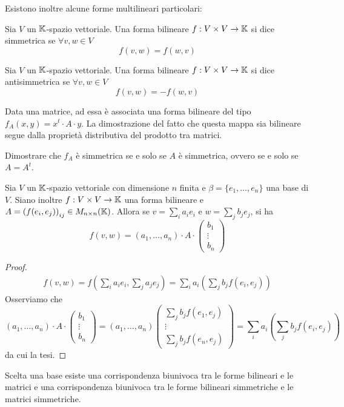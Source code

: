 \documentclass{article}     %
\begin{document}
Esistono inoltre alcune forme multilineari particolari:
\begin{boxdef}
    Sia $V$ un $\mathbb{K}$-spazio vettoriale. Una forma bilineare $f:V\times V \to \mathbb{K}$ si dice simmetrica se $\forall v, w\in V$
    \[f(v,w)=f(w,v)\]
\end{boxdef}
\begin{boxdef}
    Sia $V$ un $\mathbb{K}$-spazio vettoriale. Una forma bilineare $f:V\times V \to \mathbb{K}$ si dice antisimmetrica se $\forall v, w\in V$
    \[f(v,w)=-f(w,v)\]
\end{boxdef}
Data una matrice, ad essa è associata una forma bilineare del tipo $f_A(x,y)=x^t\cdot A \cdot y$. La dimostrazione del fatto che questa mappa sia bilineare segue dalla proprietà distributiva del prodotto tra matrici.
\begin{exc}\label{exc: simmetriche sse}
    Dimostrare che $f_A$ è simmetrica se e solo se $A$ è simmetrica, ovvero se e solo se $A=A^t$. 
\end{exc}



\begin{shadedTheorem}
    Sia $V$ un $\mathbb{K}$-spazio vettoriale con dimensione $n$ finita e $\beta=\{e_1, \dots, e_n\}$ una base di $V$. Siano inoltre $f:V\times V \to \mathbb{K}$ una forma bilineare e $A=\left( f(e_i,e_j) \right)_{ij}\in M_{n\times n }(\mathbb{K})$. Allora se $v=\sum_ia_ie_i$ e $w=\sum _jb_je_j$, si ha 
    \[f(v,w)=\left( a_1,\dots, a_n \right) \cdot A \cdot \begin{pmatrix}
        b_1\\\vdots\\ b_n
    \end{pmatrix}\]
\end{shadedTheorem}
\begin{proof}
    \[
    \begin{aligned}
        f(v,w)= f\left(\sum_ia_ie_i,\sum_ja_je_j\right)= \sum_ia_i\left( \sum_j b_jf(e_i,e_j) \right)
    \end{aligned}
    \]
    Osserviamo che 
    \[\left( a_1,\dots, a_n \right) \cdot A \cdot \begin{pmatrix}
        b_1\\\vdots\\ b_n
    \end{pmatrix} = \left( a_1,\dots, a_n \right)\begin{pmatrix}
        \sum_j b_jf(e_1,e_j)\\ \vdots \\ \sum_j b_jf(e_n,e_j)
    \end{pmatrix}  = \sum_ia_i\left( \sum_j b_jf(e_i,e_j)\right)\]
    da cui la tesi.
\end{proof}
\begin{oss}
    Scelta una base esiste una corrispondenza biunivoca tra le forme bilineari e le matrici e una corrispondenza biunivoca tra le forme bilineari simmetriche e le matrici simmetriche.
\end{oss}
\end{document}
